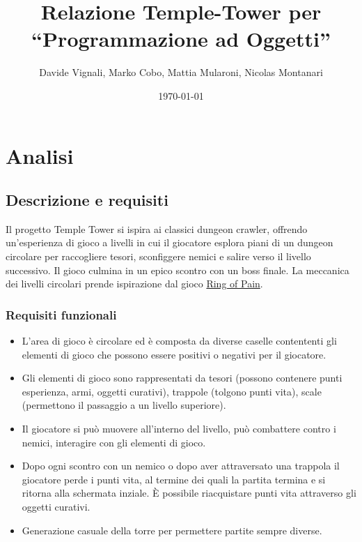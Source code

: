 \documentclass[a4paper,12pt]{report}
\title{Relazione Temple-Tower per\\``Programmazione ad Oggetti''}
\author{Davide Vignali, Marko Cobo, Mattia Mularoni, Nicolas Montanari}
\date{\today}
\begin{document}
\maketitle

\tableofcontents

\chapter{Analisi}

\section{Descrizione e requisiti}

Il progetto Temple Tower si ispira ai classici dungeon crawler, offrendo un’esperienza di gioco a livelli in cui il giocatore esplora piani di un dungeon circolare per raccogliere tesori, sconfiggere nemici e salire verso il livello successivo. Il gioco culmina in un epico scontro con un boss finale.
%
La meccanica dei livelli circolari prende ispirazione dal gioco \href{https://ring-of-pain.fandom.com/wiki/Ring_of_Pain_Wiki}{Ring of Pain}.


\subsection*{Requisiti funzionali}
\begin{itemize}
	\item L'area di gioco è circolare ed è composta da diverse caselle contententi gli elementi di gioco che possono essere positivi o negativi per il giocatore.
	\item Gli elementi di gioco sono rappresentati da tesori (possono contenere punti esperienza, armi, oggetti curativi), trappole (tolgono punti vita), scale (permettono il passaggio a un livello superiore).
	\item Il giocatore si può muovere all'interno del livello, può combattere contro i nemici,  interagire con gli elementi di gioco.
	\item Dopo ogni scontro con un nemico o dopo aver attraversato una trappola il giocatore perde i punti vita, al termine dei quali la partita termina e si ritorna alla schermata inziale. È possibile riacquistare punti vita attraverso gli oggetti curativi.
    \item Generazione casuale della torre per permettere partite sempre diverse.
\end{itemize}
\end{document}
